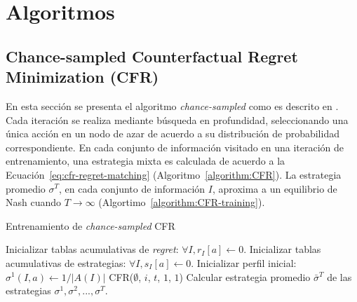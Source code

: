 \chapter{Algoritmos}
\label{apex:chapter:algoritmos}
\algnewcommand{\OR}{\algorithmicor}
\algnewcommand{\AND}{\algorithmicand}

%


\section*{Chance-sampled Counterfactual Regret Minimization (CFR)}

En esta sección se presenta el algoritmo \textit{chance-sampled} como es descrito en \cite{bib:introductionCFR}. Cada iteración se realiza mediante búsqueda en profundidad, seleccionando una única acción en un nodo de azar de acuerdo a su distribución de probabilidad correspondiente. En cada conjunto de información visitado en una iteración de entrenamiento, una estrategia mixta es calculada de acuerdo a la Ecuación~\ref{eq:cfr-regret-matching} (Algoritmo~\ref{algorithm:CFR}). La estrategia promedio $\sigma^T$, en cada conjunto de información $I$, aproxima a un equilibrio de Nash cuando $T \rightarrow \infty$ (Algortimo~\ref{algorithm:CFR-training}).

\vspace{12pt}
\begin{algorithm}[H]
\caption{Entrenamiento de \textit{chance-sampled} CFR}
\label{algorithm:CFR-training}
\begin{algorithmic}[1]
    \State Inicializar tablas acumulativas de \textit{regret}: $\forall I, r_I[a] \leftarrow 0$.
    \State Inicializar tablas acumulativas de estrategias: $\forall I, s_I[a] \leftarrow 0$.
    \State Inicializar perfil inicial: $\sigma^1(I, a) \leftarrow 1/|A(I)|$ \label{x}
    \State
                \State CFR($\emptyset$, $i$, $t$, $1$, $1$)
            \EndFor
        \EndFor
    \EndFunction
    \State Calcular estrategia promedio $\bar\sigma^T$ de las estrategias $\sigma^1, \sigma^2, ..., \sigma^T$.
\end{algorithmic}
\end{algorithm}

